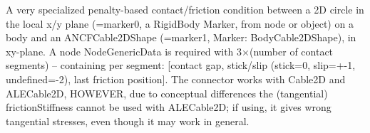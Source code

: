 \ei

%
\newpage


\label{sec:item:ObjectContactFrictionCircleCable2D}
A very specialized penalty-based contact/friction condition between a 2D circle in the local x/y plane (=marker0, a RigidBody Marker, from node or object) on a body and an ANCFCable2DShape (=marker1, Marker: BodyCable2DShape), in xy-plane. A node NodeGenericData is required with 3$\times$(number of contact segments) -- containing per segment: [contact gap, stick/slip (stick=0, slip=+-1, undefined=-2), last friction position]. The connector works with Cable2D and ALECable2D, HOWEVER, due to conceptual differences the (tangential) frictionStiffness cannot be used with ALECable2D; if using, it gives wrong tangential stresses, even though it may work in general.
\vspace{12pt}\\

